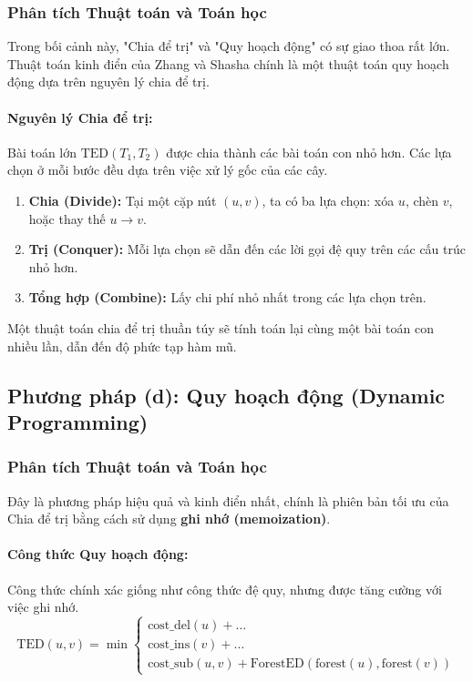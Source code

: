 \documentclass[a4paper,12pt]{article}
\begin{document}
\subsubsection{Phân tích Thuật toán và Toán học}
Trong bối cảnh này, "Chia để trị" và "Quy hoạch động" có sự giao thoa rất lớn. Thuật toán kinh điển của Zhang và Shasha chính là một thuật toán quy hoạch động dựa trên nguyên lý chia để trị.

\paragraph{Nguyên lý Chia để trị:}
Bài toán lớn $\text{TED}(T_1, T_2)$ được chia thành các bài toán con nhỏ hơn. Các lựa chọn ở mỗi bước đều dựa trên việc xử lý gốc của các cây.
\begin{enumerate}
    \item \textbf{Chia (Divide):} Tại một cặp nút $(u, v)$, ta có ba lựa chọn: xóa $u$, chèn $v$, hoặc thay thế $u \to v$.
    \item \textbf{Trị (Conquer):} Mỗi lựa chọn sẽ dẫn đến các lời gọi đệ quy trên các cấu trúc nhỏ hơn.
    \item \textbf{Tổng hợp (Combine):} Lấy chi phí nhỏ nhất trong các lựa chọn trên.
\end{enumerate}
Một thuật toán chia để trị thuần túy sẽ tính toán lại cùng một bài toán con nhiều lần, dẫn đến độ phức tạp hàm mũ.

\subsection{Phương pháp (d): Quy hoạch động (Dynamic Programming)}
\subsubsection{Phân tích Thuật toán và Toán học}
Đây là phương pháp hiệu quả và kinh điển nhất, chính là phiên bản tối ưu của Chia để trị bằng cách sử dụng \textbf{ghi nhớ (memoization)}.

\paragraph{Công thức Quy hoạch động:}
Công thức chính xác giống như công thức đệ quy, nhưng được tăng cường với việc ghi nhớ.
\[
\text{TED}(u, v) = \min
\begin{cases}
    \text{cost\_del}(u) + \dots \\
    \text{cost\_ins}(v) + \dots \\
    \text{cost\_sub}(u, v) + \text{ForestED}(\text{forest}(u), \text{forest}(v))
\end{cases}
\]
\end{document}
